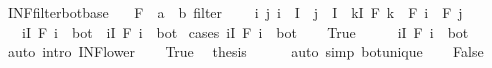 \begin{isabellebody}
\isamarkupfalse%
%
\endisatagproof
{\isafoldproof}%
%
\isadelimproof
\isanewline
%
\endisadelimproof
\isanewline
{}\isamarkupfalse%
\ INF{\isacharunderscore}{\kern0pt}filter{\isacharunderscore}{\kern0pt}bot{\isacharunderscore}{\kern0pt}base{\isacharcolon}{\kern0pt}\isanewline
\ \ \ F\ {\isacharcolon}{\kern0pt}{\isacharcolon}{\kern0pt}\ {\isachardoublequoteopen}{\isacharprime}{\kern0pt}a\ {\isasymRightarrow}\ {\isacharprime}{\kern0pt}b\ filter{\isachardoublequoteclose}\isanewline
\ \ \ {\isacharasterisk}{\kern0pt}{\isacharcolon}{\kern0pt}\ {\isachardoublequoteopen}{\isasymAnd}i\ j{\isachardot}{\kern0pt}\ i\ {\isasymin}\ I\ {\isasymLongrightarrow}\ j\ {\isasymin}\ I\ {\isasymLongrightarrow}\ {\isasymexists}k{\isasymin}I{\isachardot}{\kern0pt}\ F\ k\ {\isasymle}\ F\ i\ {\isasymsqinter}\ F\ j{\isachardoublequoteclose}\isanewline
\ \ \ {\isachardoublequoteopen}{\isacharparenleft}{\kern0pt}{\isasymSqinter}i{\isasymin}I{\isachardot}{\kern0pt}\ F\ i{\isacharparenright}{\kern0pt}\ {\isacharequal}{\kern0pt}\ bot\ {\isasymlongleftrightarrow}\ {\isacharparenleft}{\kern0pt}{\isasymexists}i{\isasymin}I{\isachardot}{\kern0pt}\ F\ i\ {\isacharequal}{\kern0pt}\ bot{\isacharparenright}{\kern0pt}{\isachardoublequoteclose}\isanewline
%
\isadelimproof
%
\endisadelimproof
%
\isatagproof
{}\isamarkupfalse%
\ {\isacharparenleft}{\kern0pt}cases\ {\isachardoublequoteopen}{\isasymexists}i{\isasymin}I{\isachardot}{\kern0pt}\ F\ i\ {\isacharequal}{\kern0pt}\ bot{\isachardoublequoteclose}{\isacharparenright}{\kern0pt}\isanewline
\ \ \isamarkupfalse%
\ True\isanewline
\ \ \isamarkupfalse%
\ \isamarkupfalse%
\ {\isachardoublequoteopen}{\isacharparenleft}{\kern0pt}{\isasymSqinter}i{\isasymin}I{\isachardot}{\kern0pt}\ F\ i{\isacharparenright}{\kern0pt}\ {\isasymle}\ bot{\isachardoublequoteclose}\isanewline
\ \ \ \ \isamarkupfalse%
\ {\isacharparenleft}{\kern0pt}auto\ intro{\isacharcolon}{\kern0pt}\ INF{\isacharunderscore}{\kern0pt}lower{}{\isacharparenright}{\kern0pt}\isanewline
\ \ \isamarkupfalse%
\ True\ \isamarkupfalse%
\ {\isacharquery}{\kern0pt}thesis\isanewline
\ \ \ \ \isamarkupfalse%
\ {\isacharparenleft}{\kern0pt}auto\ simp{\isacharcolon}{\kern0pt}\ bot{\isacharunderscore}{\kern0pt}unique{\isacharparenright}{\kern0pt}\isanewline
{}\isamarkupfalse%
\isanewline
\ \ \isamarkupfalse%
\ False\isanewline
\ \ \isamarkupfalse%

\end{isabellebody}
